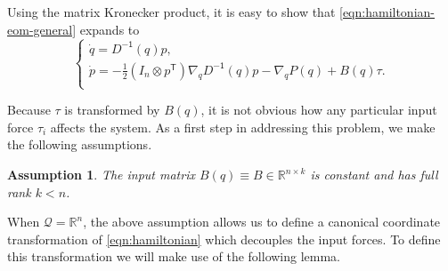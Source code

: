 \documentclass[journal,twoside,web, twocolumn,draftcls]{ieeecolor}
\newtheorem{assm}{Assumption} %
\newcommand*{\tpose}{^\mathsf{T}}
\newcommand*{\inv}{^\mathsf{-1}}
\newcommand*{\R}{\mathbb{R}}
\newcommand*{\Id}[1]{I_{#1}}
\begin{document}
Using the matrix Kronecker product, it is easy to show that
\eqref{eqn:hamiltonian-eom-general} expands to
\begin{equation*}\label{eqn:hamiltonian-full-dynamics}
     \begin{cases}
        \dot{q} = D\inv(q)p 
        , \\
        \dot{p} = -\frac{1}{2} (\Id{n} \otimes p\tpose) \nabla_q D\inv(q) p
        - \nabla_q P(q) + B(q) \tau
        . \\
    \end{cases}
\end{equation*}

Because \(\tau\) is transformed by \(B(q)\), it is not obvious how any
particular input force \(\tau_i\) affects the system.
As a first step in addressing this problem, we make the following assumptions.

\begin{assm}\label{assm:B-const}
    The input matrix \(B(q) \equiv B \in \R^{n\times k}\) is constant
    and has full rank \(k < n\).
\end{assm}

%
%
When \(\mathcal{Q} = \R^n\), the above assumption allows us to define a
canonical coordinate transformation of \eqref{eqn:hamiltonian} 
which decouples the input forces.
To define this transformation we will make use of the following lemma.
\end{document}
